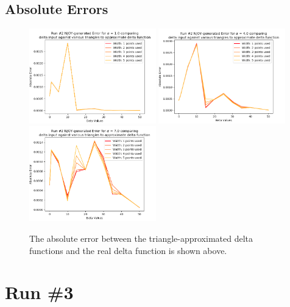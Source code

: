 \documentclass[a4paper]{article}
\begin{document}
\subsection{Absolute Errors}
\begin{figure}[H]
\centering
\includegraphics[width=0.49\textwidth]{run2_absolute_error_alpha_equals_1.png}
\includegraphics[width=0.49\textwidth]{run2_absolute_error_alpha_equals_4.png}
\includegraphics[width=0.49\textwidth]{run2_absolute_error_alpha_equals_7.png}
\caption{\label{fig:run2_abs_error}The absolute error between the triangle-approximated delta functions and the real delta function is shown above. }
\end{figure}


\newpage


\section{Run \#3}
\end{document}
